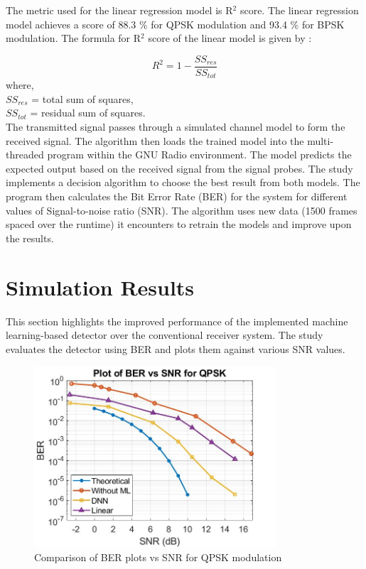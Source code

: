 \documentclass[conference]{IEEEtran}
\begin{document}
The metric used for the linear regression model is R$^{2}$ score. The linear regression model achieves a score of 88.3 \% for QPSK modulation and 93.4 \% for BPSK modulation. The formula for R$^{2}$ score of the linear model is given by : 

\begin{equation}
    R^{2} = {1 - \frac{SS_{res}}{SS_{tot}}}
\end{equation}
where,\\
${SS_{res}}$ = total sum of squares,\\
${SS_{tot}}$ = residual sum of squares.\\


The transmitted signal passes through a simulated channel model to form the received signal. The algorithm then loads the trained model into the multi-threaded program within the GNU Radio environment. The model predicts the expected output based on the received signal from the signal probes. The study implements a decision algorithm to choose the best result from both models. The program then calculates the Bit Error Rate (BER) for the system for different values of Signal-to-noise ratio (SNR). The algorithm uses new data (1500 frames spaced over the runtime) it encounters to retrain the models and improve upon the results. 


\section{Simulation Results}
This section highlights the improved performance of the implemented machine learning-based detector over the conventional receiver system. The study evaluates the detector using BER and plots them against various SNR values.


\begin{figure}[htbp]
\centerline{\includegraphics[width=9cm]{ber_plot_qpskv2.jpg}}
\caption{Comparison of BER plots vs SNR for QPSK modulation}
\label{bpsk}
\end{figure}
\end{document}
